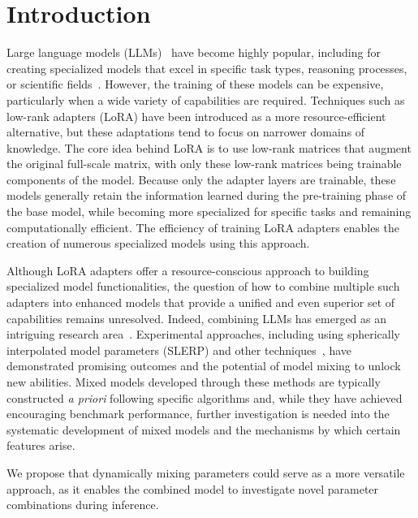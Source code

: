 \section{Introduction}  
Large language models (LLMs)~\cite{Vaswani2017AttentionNeedc,Touvron2023LlamaModels,OpenAI2023GPT-4Report,Chowdhery2022PaLM:Pathways,Jiang2023Mistral7B,Gunasekar2023TextbooksNeed} have become highly popular, including for creating specialized models that excel in specific task types, reasoning processes, or scientific fields~\cite{Bubeck2023SparksGPT-4,Buehler2023MechGPTModalities,Nejjar2023LLMsAnalysis,Buehler2023GenerativeDesign,Luu2023BioinspiredLLM:Materials,Luu2023GenerativeSolvents,Buehler2023MeLMProblemsb,Ge2023OpenAGI:Experts}. However, the training of these models can be expensive, particularly when a wide variety of capabilities are required. Techniques such as low-rank adapters (LoRA)\cite{hu2021lora} have been introduced as a more resource-efficient alternative, but these adaptations tend to focus on narrower domains of knowledge. The core idea behind LoRA is to use low-rank matrices that augment the original full-scale matrix, with only these low-rank matrices being trainable components of the model. Because only the adapter layers are trainable, these models generally retain the information learned during the pre-training phase of the base model, while becoming more specialized for specific tasks and remaining computationally efficient. The efficiency of training LoRA adapters enables the creation of numerous specialized models using this approach.

Although LoRA adapters offer a resource-conscious approach to building specialized model functionalities, the question of how to combine multiple such adapters into enhanced models that provide a unified and even superior set of capabilities remains unresolved. Indeed, combining LLMs has emerged as an intriguing research area~\cite{Kim2023SOLARUp-Scaling}. Experimental approaches, including using spherically interpolated model parameters (SLERP) and other techniques~\cite{Arcee-ai/mergekit:Models.}, have demonstrated promising outcomes and the potential of model mixing to unlock new abilities. Mixed models developed through these methods are typically constructed {\it a priori} following specific algorithms and, while they have achieved encouraging benchmark performance, further investigation is needed into the systematic development of mixed models and the mechanisms by which certain features arise.

We propose that dynamically mixing parameters could serve as a more versatile approach, as it enables the combined model to investigate novel parameter combinations during inference.

